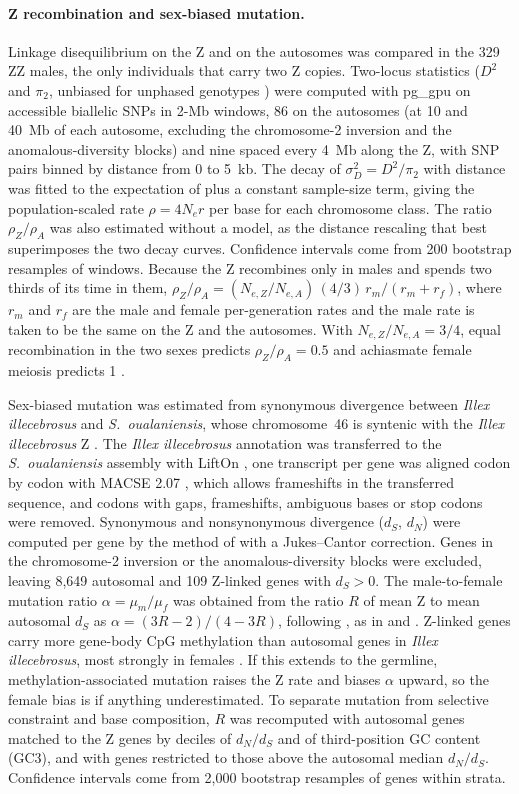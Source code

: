 \documentclass[11pt]{article}
\newcommand{\illex}{\textit{Illex illecebrosus}}
\begin{document}
\paragraph{Z recombination and sex-biased mutation.}
Linkage disequilibrium on the Z and on the autosomes was compared in the 329 ZZ males, the only individuals that
carry two Z copies. Two-locus statistics ($D^2$ and $\pi_2$, unbiased for unphased genotypes
\citep{ragsdale2020unphased}) were computed with pg\_gpu \citep{pggpu} on accessible biallelic SNPs in 2-Mb windows,
86 on the autosomes (at 10 and 40~Mb of each autosome, excluding the chromosome-2 inversion and the
anomalous-diversity blocks) and nine spaced every 4~Mb along the Z, with SNP pairs binned by distance from 0 to
5~kb. The decay of $\sigma_D^2=D^2/\pi_2$ with distance was fitted to the expectation of \citet{ohta1971} plus a
constant sample-size term, giving the population-scaled rate $\rho=4N_e r$ per base for each chromosome class. The
ratio $\rho_Z/\rho_A$ was also estimated without a model, as the distance rescaling that best superimposes the two
decay curves. Confidence intervals come from 200 bootstrap resamples of windows. Because the Z recombines only in
males and spends two thirds of its time in them, $\rho_Z/\rho_A=(N_{e,Z}/N_{e,A})\,(4/3)\,r_m/(r_m+r_f)$, where
$r_m$ and $r_f$ are the male and female per-generation rates and the male rate is taken to be the same on the Z
and the autosomes. With $N_{e,Z}/N_{e,A}=3/4$, equal recombination in the two sexes predicts $\rho_Z/\rho_A=0.5$
and achiasmate female meiosis predicts 1 \citep{coffing2026}.

Sex-biased mutation was estimated from synonymous divergence between \illex{} and \textit{S.~oualaniensis}, whose chromosome~46 is syntenic with the \illex{} Z \citep{small2026}. The \illex{} annotation was transferred to the
\textit{S.~oualaniensis} assembly with LiftOn \citep{chao2024lifton}, one transcript per gene was aligned codon by
codon with MACSE 2.07 \citep{ranwez2018macse}, which allows frameshifts in the transferred sequence, and codons
with gaps, frameshifts, ambiguous bases or stop codons were removed. Synonymous and nonsynonymous divergence
($d_S$, $d_N$) were computed per gene by the method of \citet{nei1986} with a Jukes--Cantor correction. Genes in
the chromosome-2 inversion or the anomalous-diversity blocks were excluded, leaving 8{,}649 autosomal and 109
Z-linked genes with $d_S>0$. The male-to-female mutation ratio $\alpha=\mu_m/\mu_f$ was obtained from the ratio
$R$ of mean Z to mean autosomal $d_S$ as $\alpha=(3R-2)/(4-3R)$, following \citet{miyata1987}, as in \citet{coffing2025} and
\citet{coffing2026}. Z-linked genes carry more gene-body CpG methylation than autosomal genes in \illex{}, most strongly in females \citep{small2026}. If this extends to the germline, methylation-associated mutation raises the Z rate and biases $\alpha$ upward, so the female bias is if anything underestimated. To separate mutation from selective constraint and base composition, $R$ was recomputed with
autosomal genes matched to the Z genes by deciles of $d_N/d_S$ and of third-position GC content (GC3), and with
genes restricted to those above the autosomal median $d_N/d_S$. Confidence intervals come from 2{,}000 bootstrap
resamples of genes within strata.
\end{document}
